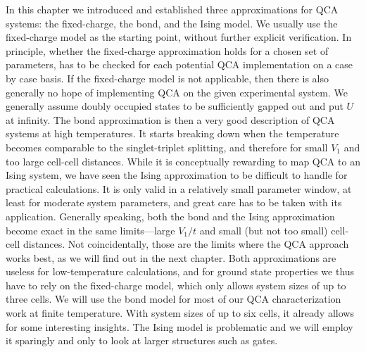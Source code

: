 In this chapter we introduced and established three approximations for QCA
systems: the fixed-charge, the bond, and the Ising model. We usually use the
fixed-charge model as the starting point, without further explicit verification.
In principle, whether the fixed-charge approximation holds for a chosen set of
parameters, has to be checked for each potential QCA implementation on a case by
case basis. If the fixed-charge model is not applicable, then there is also
generally no hope of implementing QCA on the given experimental system. We
generally assume doubly occupied states to be sufficiently gapped out and put
$U$ at infinity. The bond approximation is then a very good description of QCA
systems at high temperatures. It starts breaking down when the temperature
becomes comparable to the singlet-triplet splitting, and therefore for small
$V_1$ and too large cell-cell distances. While it is conceptually rewarding to
map QCA to an Ising system, we have seen the Ising approximation to be difficult
to handle for practical calculations. It is only valid in a relatively small
parameter window, at least for moderate system parameters, and great care has to
be taken with its application. Generally speaking, both the bond and the Ising
approximation become exact in the same limits---large $V_1/t$ and small (but not
too small) cell-cell distances. Not coincidentally, those are the limits where
the QCA approach works best, as we will find out in the next chapter. Both
approximations are useless for low-temperature calculations, and for ground state
properties we thus have to rely on the fixed-charge model, which only
allows system sizes of up to three cells. We will use the bond model for most of
our QCA characterization work at finite temperature. With system sizes of up to
six cells, it already allows for some interesting insights.  The Ising model is
problematic and we will employ it sparingly and only to look at larger
structures such as gates.

